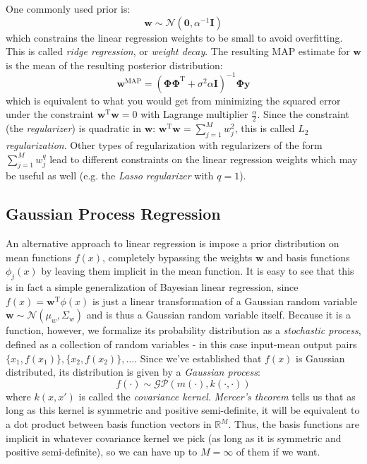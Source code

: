 \documentclass[a4paper]{article}
\begin{document}
One commonly used prior is:
\[ \mathbf{w} \sim \mathcal{N}(\mathbf{0},\alpha^{-1}\mathbf{I}) \]
which constrains the linear regression weights to be small to avoid overfitting. This is called \emph{ridge regression}, or \emph{weight decay}. The resulting MAP estimate for $\mathbf{w}$ is the mean of the resulting posterior distribution:
\[ \mathbf{w}^\textrm{MAP} = \left(\mathbf{\Phi\Phi}^\textrm{T}+ \sigma^2\alpha\mathbf{I}\right)^{-1}\mathbf{\Phi y} \]
which is equivalent to what you would get from minimizing the squared error under the constraint $\mathbf{w}^\textrm{T}\mathbf{w} = 0$ with Lagrange multiplier $\frac{\alpha}{2}$. Since the constraint (the \emph{regularizer}) is quadratic in $\mathbf{w}$: $\mathbf{w}^\textrm{T}\mathbf{w}=\sum_{j=1}^Mw_j^2$, this is called \emph{$L_2$ regularization}. Other types of regularization with regularizers of the form $\sum_{j=1}^Mw_j^q$ lead to different constraints on the linear regression weights which may be useful as well (e.g. the \emph{Lasso regularizer} with $q=1$).

\subsection{Gaussian Process Regression}
An alternative approach to linear regression is impose a prior distribution on mean functions $f(x)$, completely bypassing the weights $\mathbf{w}$ and basis functions $\phi_j(x)$ by leaving them implicit in the mean function. It is easy to see that this is in fact a simple generalization of Bayesian linear regression, since $f(x) = \mathbf{w}^\textrm{T}\phi(x)$ is just a linear transformation of a Gaussian random variable $\mathbf{w}\sim\mathcal{N}(\mu_w,\Sigma_w)$ and is thus a Gaussian random variable itself. Because it is a function, however, we formalize its probability distribution as a \emph{stochastic process}, defined as a collection of random variables - in this case input-mean output pairs $\{x_1,f(x_1)\},\{x_2,f(x_2)\},\ldots$. Since we've established that $f(x)$ is Gaussian distributed, its distribution is given by a \emph{Gaussian process}:
\[ f(\cdot) \sim \mathcal{GP}(m(\cdot),k(\cdot,\cdot)) \]
where $k(x,x')$ is called the \emph{covariance kernel}. \emph{Mercer's theorem} tells us that as long as this kernel is symmetric and positive semi-definite, it will be equivalent to a dot product between basis function vectors in $\mathbb{R}^M$. Thus, the basis functions are implicit in whatever covariance kernel we pick (as long as it is symmetric and positive semi-definite), so we can have up to $M=\infty$ of them if we want. 
\end{document}
